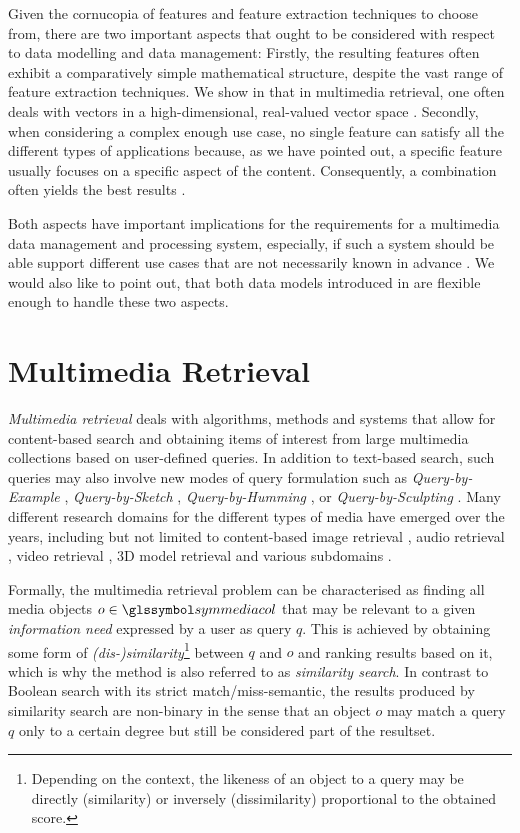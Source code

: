 Given the cornucopia of features and feature extraction techniques to choose from, there are two important aspects that ought to be considered with respect to data modelling and data management: Firstly, the resulting features often exhibit a comparatively simple mathematical structure, despite the vast range of feature extraction techniques. We show in  that in multimedia retrieval, one often deals with vectors in a high-dimensional, real-valued vector space \cite{Zezula:2006Similarity}. Secondly, when considering a complex enough use case, no single feature can satisfy all the different types of applications because, as we have pointed out, a specific feature usually focuses on a specific aspect of the content. Consequently, a combination often yields the best results \cite{Deselaers:2008Features}.

Both aspects have important implications for the requirements for a multimedia data management and processing system, especially, if such a system should be able support different use cases that are not necessarily known in advance \cite{Smeulders:2000Content}. We would also like to point out, that both data models introduced in  are flexible enough to handle these two aspects.

\section{Multimedia Retrieval}
\label{section:multimedia_retrieval}

\emph{Multimedia retrieval} deals with algorithms, methods and systems that allow for content-based search and obtaining items of interest from large multimedia collections based on user-defined queries. In addition to text-based search, such queries may also involve new modes of query formulation such as \emph{Query-by-Example} \cite{Kelly:1995Query}, \emph{Query-by-Sketch} \cite{Cao:2010mind}, \emph{Query-by-Humming} \cite{Ghias:1995query}, or \emph{Query-by-Sculpting} \cite{Boerlin:20203d}. Many different research domains for the different types of media have emerged over the years, including but not limited to content-based image retrieval \cite{Dharani:2013Survey}, audio retrieval \cite{Lu:2001Indexing}, video retrieval \cite{Hu:2011Survey}, 3D model retrieval \cite{Yang:2007Content} and various subdomains \cite{Murthy:2018Content}.

Formally, the multimedia retrieval problem can be characterised as finding all media objects $o \in \symmediacol$ that may be relevant to a given \emph{information need} expressed by a user as query $q$. This is achieved by obtaining some form of \emph{(dis-)similarity}\footnote{Depending on the context, the likeness of an object to a query may be directly (similarity) or inversely (dissimilarity) proportional to the obtained score.} between $q$ and $o$ and ranking results based on it, which is why the method is also referred to as \emph{similarity search}. In contrast to Boolean search with its strict match/miss-semantic, the results produced by similarity search are non-binary in the sense that an object $o$ may match a query $q$ only to a certain degree but still be considered part of the resultset.

